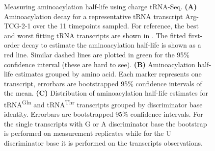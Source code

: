 \documentclass[9pt,lineno]{elife}
\begin{document}
\begin{figure}[ht!]
\centering
{}
\caption{
Measuring aminoacylation half-life using charge tRNA-Seq.
\textbf{(A)} Aminoacylation decay for a representative tRNA transcript Arg-TCG-2-1 over the 11 timepoints sampled.
For reference, the best and worst fitting tRNA transcripts are shown in .
The fitted first-order decay to estimate the aminoacylation half-life is shown as a red line.
Similar dashed lines are plotted in green for the 95\% confidence interval (these are hard to see).
\textbf{(B)} Aminoacylation half-life estimates grouped by amino acid.
Each marker represents one transcript, errorbars are bootstrapped 95\% confidence intervals of the mean.
\textbf{(C)} Distribution of aminoacylation half-life estimates for tRNA\textsuperscript{Gln} and tRNA\textsuperscript{Thr} transcripts grouped by discriminator base identity.
Errorbars are bootstrapped 95\% confidence intervals.
For the single transcripts with G or A discriminator base the bootstrap is performed on measurement replicates while for the U discriminator base it is performed on the transcripts observations.
}
\label{fig:Fig6}

\label{figsupp:f6S1}


\end{figure}
\end{document}
